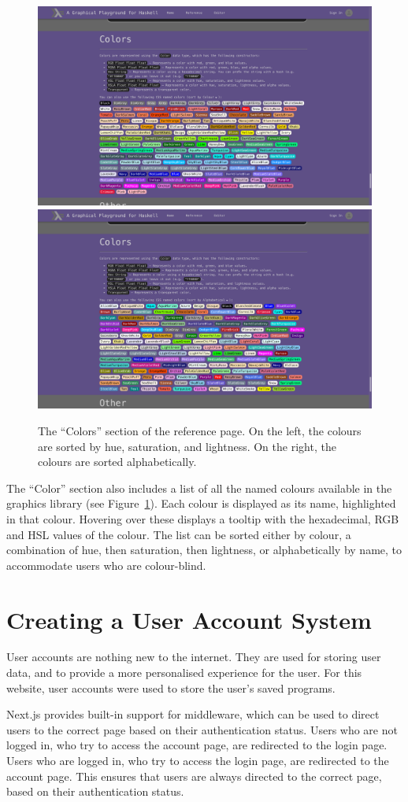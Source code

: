 \documentclass[../main.tex]{subfiles}
\begin{document}
        \begin{figure}[H]
            \centering
            \includegraphics[width=0.45\linewidth]{images/colours.png}
            \includegraphics[width=0.45\linewidth]{images/coloursAlphabetical.png}
                \caption{The ``Colors'' section of the reference page.
                    On the left, the colours are sorted by hue, saturation, and lightness.
                    On the right, the colours are sorted alphabetically.
                }
                \label{fig:colours}
        \end{figure}

        The ``Color'' section also includes a list of all the named colours available
            in the graphics library (see Figure~\ref{fig:colours}).
        Each colour is displayed as its name, highlighted in that colour.
        Hovering over these displays a tooltip with the hexadecimal, RGB and HSL values
            of the colour.
        The list can be sorted either by colour, a combination of hue, then saturation,
            then lightness, or alphabetically by name, to accommodate users who are
            colour-blind.

    \section{Creating a User Account System}
        User accounts are nothing new to the internet.
        They are used for storing user data, and to provide a more personalised
            experience for the user.
        For this website, user accounts were used to store the user's saved programs.

        Next.js provides built-in support for middleware, which can be used to direct
            users to the correct page based on their authentication status.
        Users who are not logged in, who try to access the account page, are redirected
            to the login page.
        Users who are logged in, who try to access the login page, are redirected to
            the account page.
        This ensures that users are always directed to the correct page, based on their
            authentication status.
\end{document}
